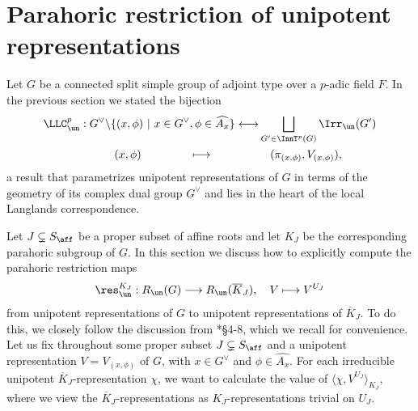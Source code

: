 \section{Parahoric restriction of unipotent representations}\label{sec:parahoric_restriction}

Let $G$ be a connected split simple group of adjoint type over a $p$-adic field $F$. In the previous section we stated the bijection
\begin{align*}
    \LLC^p_{\un}: G^\vee\backslash\{(x,\phi)\ |\ x\in G^\vee, \phi\in\widehat{A_x}\}\longleftrightarrow&\bigsqcup_{G'\in\InnT^p(G)}\Irr_{\un}(G')\\
    (x,\phi)\hspace{1.5cm}\longmapsto \hspace{1.5cm}&\quad(\pi_{(x,\phi)},V_{(x,\phi)}),
\end{align*}
a result that parametrizes unipotent representations of $G$ in terms of the geometry of its complex dual group $G^\vee$ and lies in the heart of the local Langlands correspondence.

Let $J\subsetneq S_{\aff}$ be a proper subset of affine roots and let $K_J$ be the corresponding parahoric subgroup of $G$. In this section we discuss how to explicitly compute the parahoric restriction maps 
\[
    \res_{\un}^{K_J}:R_{\un}(G)\longrightarrow R_{\un}(\overline{K}_J), \quad V\longmapsto V^{U_J}
\]
from unipotent representations of $G$ to unipotent representations of $\overline{K}_J$. %
To do this, we closely follow the discussion from \cite{Reeder2000}*{\S4-8}, which we recall for convenience. Let us fix throughout some proper subset $J\subsetneq S_{\aff}$ and a unipotent representation $V=V_{(x,\phi)}$ of $G$, with $x\in G^\vee$ and $\phi\in\widehat{A_x}$. 
For each irreducible unipotent $\overline{K}_J$-representation $\chi$, we want to calculate the value of 
$\langle\chi,V^{U_J}\rangle_{K_J},$
where we view the $\overline{K}_J$-representations as $K_J$-representations trivial on $U_J$.

